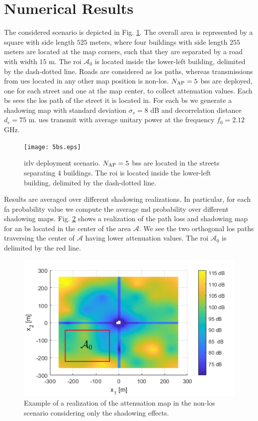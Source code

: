 \documentclass[conference,final]{IEEEtran}
\begin{document}
\section{Numerical Results}\label{sec: nr}

The considered scenario is depicted in Fig. \ref{fig:5bs}. The overall area is represented by a square with side length $525$ meters, where four buildings with side length $255$ meters are located at the map corners, such that they are separated by a road with width $15$ m. The \ac{roi} $\mathcal{A}_0$ is located inside the lower-left building, delimited by the dash-dotted line. Roads are considered as \ac{los} paths, whereas transmissions from \acp{ue} located in any other map position is non-\ac{los}. $N_{\rm AP}=5$ \acp{bs} are deployed, one for each street and one at the map center, to collect attenuation values. Each \ac{bs} sees the \ac{los} path of the street it is located in. For each \ac{bs} we generate a shadowing map with standard deviation $\sigma_s = 8$ dB and decorrelation distance $d_c = 75$ m. \acp{ue} transmit with average unitary power at the frequency $f_0 = 2.12$ GHz.

 \begin{figure}[h]
     \centering
     \texttt{[image: 5bs.eps]}
     \caption{\ac{irlv} deployment scenario. $N_{\rm AP}=5$ \acp{bs} are located in the streets separating 4 buildings. The \ac{roi} is located inside the lower-left building, delimited by the dash-dotted line.}
     \label{fig:5bs}
 \end{figure}
 
Results are averaged over different shadowing realizations. In particular, for each \ac{fa} probability value we compute the average \ac{md} probability over different shadowing maps.
Fig. \ref{fig:trueMap} shows a realization of the path loss and shadowing map for an \ac{bs} located in the center of the area $\mathcal{A}$. 
We see the two orthogonal \ac{los} paths traversing the center of $\mathcal{A}$ having lower attenuation values. The \ac{roi} $\mathcal A_0$ is delimited by the red line.


\begin{figure}[t]
    \centering
    \includegraphics[width=1\columnwidth]{surfColorato.png}
    \caption{Example of a realization of the attenuation map in the non-\ac{los} scenario considering only the shadowing effects.}
    \label{fig:trueMap}
\end{figure}
\end{document}
